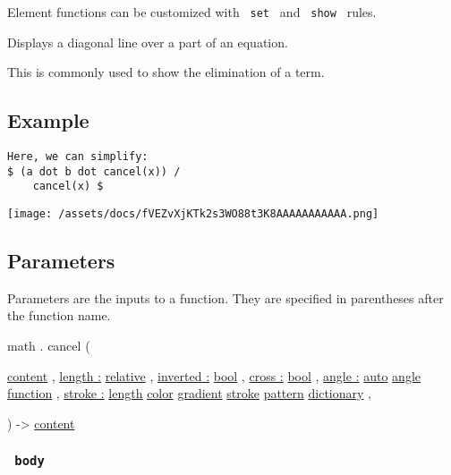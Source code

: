 \label{element-tooltip}
Element functions can be customized with \texttt{\ set\ } and
\texttt{\ show\ } rules.

Displays a diagonal line over a part of an equation.

This is commonly used to show the elimination of a term.

\subsection{Example}\label{example}

\begin{verbatim}
Here, we can simplify:
$ (a dot b dot cancel(x)) /
    cancel(x) $
\end{verbatim}

\texttt{[image: /assets/docs/fVEZvXjKTk2s3WO88t3K8AAAAAAAAAAA.png]}

\subsection{\texorpdfstring{{ Parameters
}}{ Parameters }}\label{parameters}

\label{parameters-tooltip}
Parameters are the inputs to a function. They are specified in
parentheses after the function name.

math { . } { cancel } (

{ \href{/docs/reference/foundations/content/}{content} , } {
\hyperref[parameters-length]{length :}
\href{/docs/reference/layout/relative/}{relative} , } {
\hyperref[parameters-inverted]{inverted :}
\href{/docs/reference/foundations/bool/}{bool} , } {
\hyperref[parameters-cross]{cross :}
\href{/docs/reference/foundations/bool/}{bool} , } {
\hyperref[parameters-angle]{angle :}
\href{/docs/reference/foundations/auto/}{auto}
\href{/docs/reference/layout/angle/}{angle}
\href{/docs/reference/foundations/function/}{function} , } {
\hyperref[parameters-stroke]{stroke :}
\href{/docs/reference/layout/length/}{length}
\href{/docs/reference/visualize/color/}{color}
\href{/docs/reference/visualize/gradient/}{gradient}
\href{/docs/reference/visualize/stroke/}{stroke}
\href{/docs/reference/visualize/pattern/}{pattern}
\href{/docs/reference/foundations/dictionary/}{dictionary} , }

) -\textgreater{} \href{/docs/reference/foundations/content/}{content}

\subsubsection{\texorpdfstring{\texttt{\ body\ }}{ body }}\label{parameters-body}

